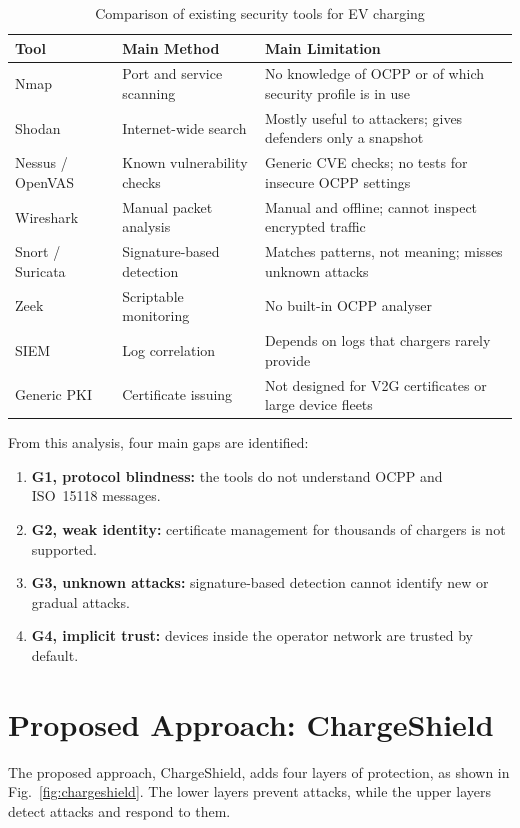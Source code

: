 \documentclass[runningheads]{llncs}
\begin{document}
\begin{table}[t]
\centering
\caption{Comparison of existing security tools for EV charging}
\label{tab:tools}
\footnotesize
\begin{tabularx}{\textwidth}{@{}l l X@{}}
\toprule
\textbf{Tool} & \textbf{Main Method} & \textbf{Main Limitation}\\
\midrule
Nmap & Port and service scanning & No knowledge of OCPP or of which security profile is in use\\
Shodan & Internet-wide search & Mostly useful to attackers; gives defenders only a snapshot\\
Nessus / OpenVAS & Known vulnerability checks & Generic CVE checks; no tests for insecure OCPP settings\\
Wireshark & Manual packet analysis & Manual and offline; cannot inspect encrypted traffic\\
Snort / Suricata & Signature-based detection & Matches patterns, not meaning; misses unknown attacks\\
Zeek & Scriptable monitoring & No built-in OCPP analyser\\
SIEM & Log correlation & Depends on logs that chargers rarely provide\\
Generic PKI & Certificate issuing & Not designed for V2G certificates or large device fleets\\
\bottomrule
\end{tabularx}
\end{table}

From this analysis, four main gaps are identified:
\begin{enumerate}
  \item \textbf{G1, protocol blindness:} the tools do not understand OCPP and ISO~15118 messages.
  \item \textbf{G2, weak identity:} certificate management for thousands of chargers is not supported.
  \item \textbf{G3, unknown attacks:} signature-based detection cannot identify new or gradual attacks.
  \item \textbf{G4, implicit trust:} devices inside the operator network are trusted by default.
\end{enumerate}

\section{Proposed Approach: ChargeShield}
The proposed approach, ChargeShield, adds four layers of protection, as shown in Fig.~\ref{fig:chargeshield}. The lower layers prevent attacks, while the upper layers detect attacks and respond to them.
\end{document}
